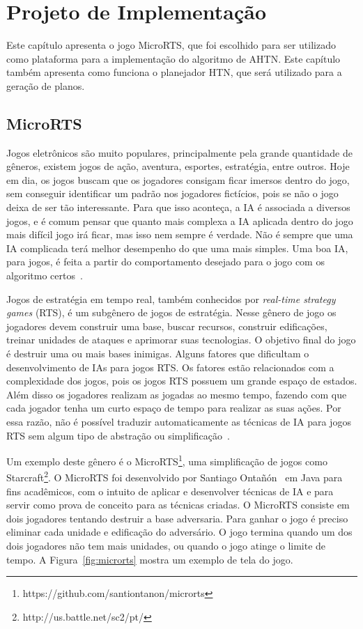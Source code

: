 
\chapter{\label{chap:proj}Projeto de Implementação}

Este capítulo apresenta o jogo MicroRTS, que foi escolhido para ser utilizado como plataforma para a implementação do algoritmo de AHTN. Este capítulo também apresenta como funciona o planejador HTN, que será utilizado para a geração de planos.

\section{MicroRTS}  \label{sec:microrts}

Jogos eletrônicos são muito populares, principalmente pela grande quantidade de gêneros, existem jogos de ação, aventura, esportes, estratégia, entre outros. Hoje em dia, os jogos buscam que os jogadores consigam ficar imersos dentro do jogo, sem conseguir identificar um padrão nos jogadores fictícios, pois se não o jogo deixa de ser tão interessante.
Para que isso aconteça, a IA é associada a diversos jogos, e é comum pensar que quanto mais complexa a IA aplicada dentro do jogo mais difícil jogo irá ficar, mas isso nem sempre é verdade.
Não é sempre que uma IA complicada terá melhor desempenho do que uma mais simples.
Uma boa IA, para jogos, é feita a partir do comportamento desejado para o jogo com os algoritmo certos~\cite{millington2009artificial}.

Jogos de estratégia em tempo real, também conhecidos por \textit{real-time strategy games} (RTS), é um subgênero de jogos de estratégia. 
Nesse gênero de jogo os jogadores devem construir uma base, buscar recursos, construir edificações, treinar unidades de ataques e aprimorar suas tecnologias.
O objetivo final do jogo é destruir uma ou mais bases inimigas. 
Alguns fatores que dificultam o desenvolvimento de IAs para jogos RTS. 
Os fatores estão relacionados com a complexidade dos jogos, pois os jogos RTS possuem um grande espaço de estados.
Além disso os jogadores realizam as jogadas ao mesmo tempo, fazendo com que cada jogador tenha um curto espaço de tempo para realizar as suas ações.
Por essa razão, não é possível traduzir automaticamente as técnicas de IA para jogos RTS sem algum tipo de abstração ou simplificação~\cite{ontanon2013survey, buro2012real}.

Um exemplo deste gênero é o MicroRTS\footnote{https://github.com/santiontanon/microrts}, uma simplificação de jogos como Starcraft\footnote{http://us.battle.net/sc2/pt/}. 
O MicroRTS foi desenvolvido por Santiago Ontañón~\cite{ontanon2013combinatorial} em Java para fins acadêmicos, com o intuito de aplicar e desenvolver técnicas de IA e para servir como prova de conceito para as técnicas criadas.
O MicroRTS consiste em dois jogadores tentando destruir a base adversaria. 
Para ganhar o jogo é preciso eliminar cada unidade e edificação do adversário. 
O jogo termina quando um dos dois jogadores não tem mais unidades, ou quando o jogo atinge o limite de tempo. 
A Figura~\ref{fig:microrts} mostra um exemplo de tela do jogo.

